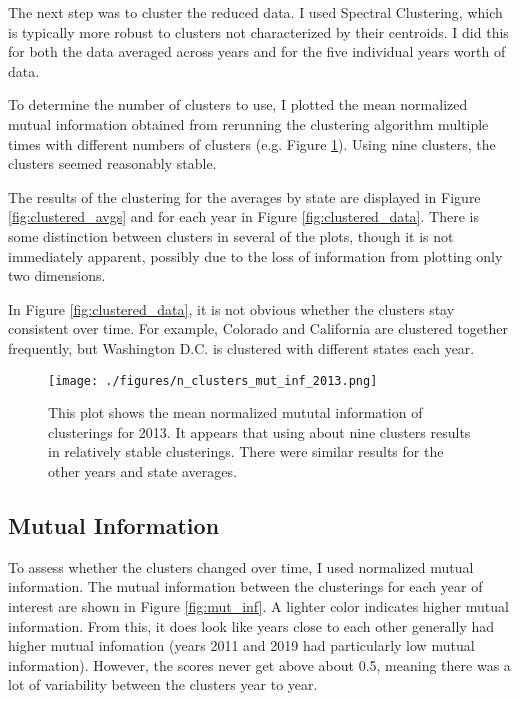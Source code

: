 \documentclass[11pt]{article}
\begin{document}
The next step was to cluster the reduced data. I used Spectral Clustering, which is typically more robust to clusters not characterized by their centroids. I did this for both the data averaged across years and for the five individual years worth of data.

To determine the number of clusters to use, I plotted the mean normalized mutual information obtained from rerunning the clustering algorithm multiple times with different numbers of clusters (e.g. Figure \ref{fig:n_clusters}). Using nine clusters, the clusters seemed reasonably stable. 

The results of the clustering for the averages by state are displayed in Figure \ref{fig:clustered_avgs} and for each year in Figure \ref{fig:clustered_data}. There is some distinction between clusters in several of the plots, though it is not immediately apparent, possibly due to the loss of information from plotting only two dimensions.

In Figure \ref{fig:clustered_data}, it is not obvious whether the clusters stay consistent over time. For example, Colorado and California are clustered together frequently, but Washington D.C. is clustered with different states each year. 

\begin{figure}[htbp]
\centering
\texttt{[image: ./figures/n\_clusters\_mut\_inf\_2013.png]}
\caption{This plot shows the mean normalized mututal information of clusterings for 2013. It appears that using about nine clusters results in relatively stable clusterings. There were similar results for the other years and state averages.}
\label{fig:n_clusters}
\end{figure}

\subsection{Mutual Information}

To assess whether the clusters changed over time, I used normalized mutual information. The mutual information between the clusterings for each year of interest are shown in Figure \ref{fig:mut_inf}. A lighter color indicates higher mutual information. From this, it does look like years close to each other generally had higher mutual infomation (years 2011 and 2019 had particularly low mutual information). However, the scores never get above about 0.5, meaning there was a lot of variability between the clusters year to year. 
\end{document}
